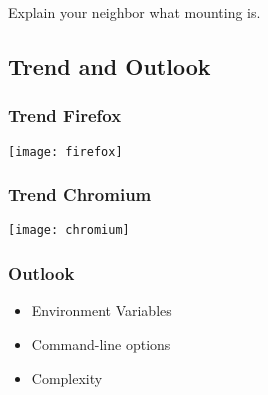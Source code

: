 \begin{assignment}
	\begin{task}
	Explain your neighbor what mounting is.
	\end{task}
\end{assignment}


\subsection{Trend and Outlook}

\begin{frame}
	\frametitle{Trend Firefox}
	\texttt{[image: firefox]}
\end{frame}

\begin{frame}
	\frametitle{Trend Chromium}
	\texttt{[image: chromium]}
\end{frame}

\begin{frame}
	\frametitle{Outlook}
	\begin{itemize}
	\item Environment Variables
	\item Command-line options
	\item Complexity
	\end{itemize}
\end{frame}





\appendix

\begin{frame}[allowframebreaks]
	
	
\end{frame}



